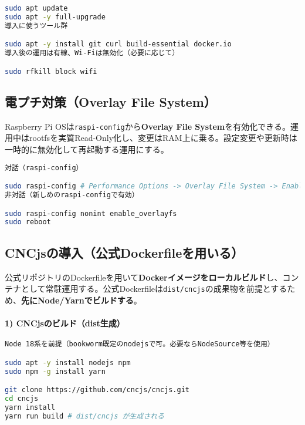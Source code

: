 \documentclass[uplatex,dvipdfmx]{ujarticle}
\begin{document}
\begin{lstlisting}[caption=初期パッケージ導入（APT）, label=code:apt-init, language=bash]
sudo apt update
sudo apt -y full-upgrade
導入に使うツール群

sudo apt -y install git curl build-essential docker.io
導入後の運用は有線、Wi-Fiは無効化（必要に応じて）

sudo rfkill block wifi
\end{lstlisting}

\subsection*{電プチ対策（Overlay File System）}
Raspberry Pi OSは\texttt{raspi-config}から\textbf{Overlay File System}を有効化できる。運用中はrootfsを実質Read-Only化し、変更はRAM上に乗る。設定変更や更新時は一時的に無効化して再起動する運用にする。

\begin{lstlisting}[caption=OverlayFSの有効化（対話/非対話の例）, label=code:overlay, language=bash]
対話（raspi-config）

sudo raspi-config # Performance Options -> Overlay File System -> Enable
非対話（新しめのraspi-configで有効）

sudo raspi-config nonint enable_overlayfs
sudo reboot
\end{lstlisting}

\subsection*{CNCjsの導入（公式Dockerfileを用いる）}

公式リポジトリのDockerfileを用いて\textbf{Dockerイメージをローカルビルド}し、コンテナとして常駐運用する。公式Dockerfileは\texttt{dist/cncjs}の成果物を前提とするため、\textbf{先にNode/Yarnでビルドする}。

\paragraph{1) CNCjsのビルド（dist生成）}
\begin{lstlisting}[caption=Node/Yarnでフロントをビルド（Pi上で可）, label=code:build-dist, language=bash]
Node 18系を前提（bookworm既定のnodejsで可。必要ならNodeSource等を使用）

sudo apt -y install nodejs npm
sudo npm -g install yarn

git clone https://github.com/cncjs/cncjs.git
cd cncjs
yarn install
yarn run build # dist/cncjs が生成される
\end{lstlisting}
\end{document}
